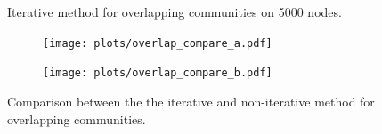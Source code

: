 \begin{figure}
\begin{subfigure}{0.5\textwidth}
    \end{subfigure}
    \label{fig:iter_overlap_5000N}
    \caption{Iterative method for overlapping communities on 5000 nodes.}
\end{figure}

\begin{figure}
    \centering
    \begin{subfigure}{0.5\textwidth}
    \texttt{[image: plots/overlap\_compare\_a.pdf]}
    \end{subfigure}%
    \begin{subfigure}{0.5\textwidth}
    \texttt{[image: plots/overlap\_compare\_b.pdf]}
    \end{subfigure}
    \label{fig:compare_iter_overlap}
    \caption{Comparison between the the iterative and non-iterative method for overlapping communities.}
\end{figure}


